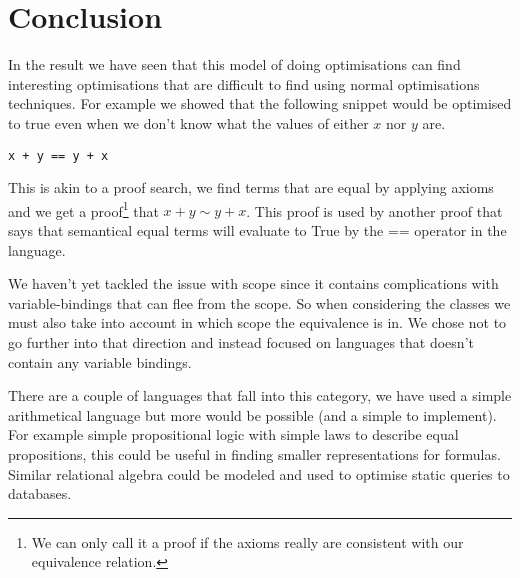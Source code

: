 
\section{Conclusion}
In the result we have seen that this model of doing optimisations can find interesting
optimisations that are difficult to find using normal optimisations techniques\cite{santos}.
For example we showed that the following snippet would be optimised to true even
when we don't know what the values of either $x$ nor $y$ are.

\begin{verbatim}
x + y == y + x
\end{verbatim}

This is akin to a proof search, we find terms that are equal by applying axioms
and we get a proof\footnote{We can only call it a proof if the axioms really are 
consistent with our equivalence relation.} that $x + y \sim y + x$. This proof
is used by another proof that says that semantical equal terms will evaluate to 
True by the == operator in the language.

We haven't yet tackled the issue with scope since it contains complications
with variable-bindings that can flee from the scope. So when considering the classes
we must also take into account in which scope the equivalence is in. We chose not
to go further into that direction and instead focused on languages that doesn't
contain any variable bindings.

There are a couple of languages that fall into this category, we have used a simple
arithmetical language but more would be possible (and a simple to implement). For
example simple propositional logic with simple laws to describe equal propositions,
this could be useful in finding smaller representations for formulas. Similar
relational algebra could be modeled and used to optimise static queries to databases.

 